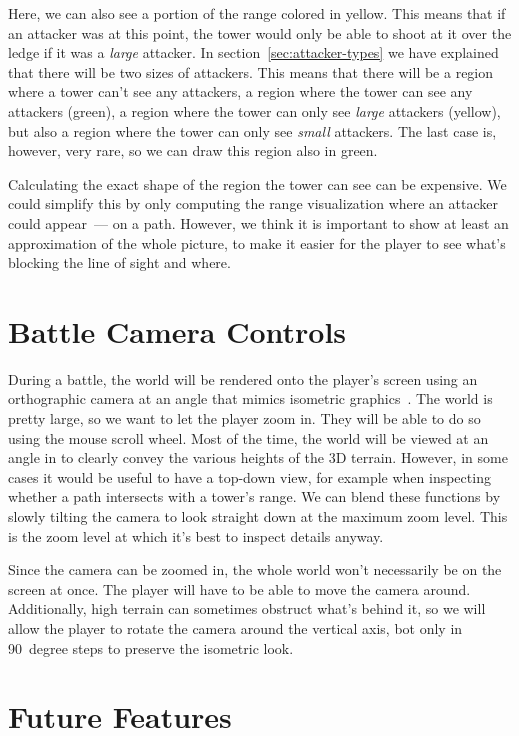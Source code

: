 Here, we can also see a portion of the range colored in yellow.
This means that if an attacker was at this point, the tower would only be able to shoot at it over the ledge if it was a \emph{large} attacker.
In section~\ref{sec:attacker-types} we have explained that there will be two sizes of attackers.
This means that there will be a region where a tower can't see any attackers, a region where the tower can see any attackers (green), a region where the tower can only see \emph{large} attackers (yellow), but also a region where the tower can only see \emph{small} attackers.
The last case is, however, very rare, so we can draw this region also in green.

Calculating the exact shape of the region the tower can see can be expensive.
We could simplify this by only computing the range visualization where an attacker could appear~--- on a path.
However, we think it is important to show at least an approximation of the whole picture, to make it easier for the player to see what's blocking the line of sight and where.

\section{Battle Camera Controls}

During a battle, the world will be rendered onto the player's screen using an orthographic camera at an angle that mimics isometric graphics~\cite{IsometricWiki}.
The world is pretty large, so we want to let the player zoom in.
They will be able to do so using the mouse scroll wheel.
Most of the time, the world will be viewed at an angle in to clearly convey the various heights of the 3D terrain.
However, in some cases it would be useful to have a top-down view, for example when inspecting whether a path intersects with a tower's range.
We can blend these functions by slowly tilting the camera to look straight down at the maximum zoom level.
This is the zoom level at which it's best to inspect details anyway.

Since the camera can be zoomed in, the whole world won't necessarily be on the screen at once.
The player will have to be able to move the camera around.
Additionally, high terrain can sometimes obstruct what's behind it, so we will allow the player to rotate the camera around the vertical axis, bot only in 90~degree steps to preserve the isometric look.

\section{Future Features}\label{sec:future-features}

